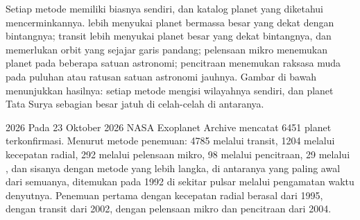 Setiap metode memiliki biasnya sendiri, dan katalog planet yang diketahui
mencerminkannya.  lebih menyukai planet bermassa besar yang dekat dengan
bintangnya; transit lebih menyukai planet besar yang dekat bintangnya, dan memerlukan
orbit yang sejajar garis pandang; pelensaan mikro menemukan planet pada beberapa satuan astronomi;
pencitraan menemukan raksasa muda pada puluhan atau ratusan satuan astronomi jauhnya.
Gambar di bawah menunjukkan hasilnya: setiap metode mengisi wilayahnya sendiri, dan
planet Tata Surya sebagian besar jatuh di celah-celah di antaranya.

\begin{dated}{2026}
Pada 23 Oktober 2026 NASA Exoplanet Archive mencatat 6451 planet
terkonfirmasi. Menurut metode penemuan: 4785 melalui transit, 1204 melalui kecepatan
radial, 292 melalui pelensaan mikro, 98 melalui pencitraan, 29 melalui , dan sisanya dengan metode yang lebih langka, di antaranya yang paling awal dari semuanya,
ditemukan pada 1992 di sekitar pulsar melalui pengamatan waktu denyutnya. Penemuan pertama
dengan kecepatan radial berasal dari 1995, dengan transit dari 2002, dengan
pelensaan mikro dan pencitraan dari 2004.
\end{dated}

